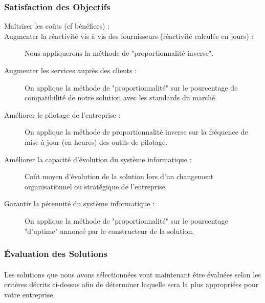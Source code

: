 \subsubsection{Satisfaction des Objectifs}

\begin{description}
\item[Maîtriser les coûts (cf bénéfices) :]
\item[Augmenter la réactivité vis à vis des fournisseurs (réactivité calculée en jours) :] Nous appliquerons la méthode de "proportionnalité inverse".
\item[Augmenter les services auprès des clients :] On applique la méthode de "proportionnalité" sur le pourcentage de compatibilité de notre solution avec les standards du marché. 
\item[Améliorer le pilotage de l'entreprise :] On applique la méthode de proportionnalité inverse sur la fréquence de mise à jour (en heures) des outils de pilotage.
\item[Améliorer la capacité d'évolution du système informatique :] Coût moyen d'évolution de la solution lors d'un changement organisationnel ou stratégique de l'entreprise
\item[Garantir la pérennité du système informatique :] On applique la méthode de "proportionnalité" sur le pourcentage "d'uptime" annoncé par le constructeur de la solution.
\end{description}


\subsubsection{Évaluation des Solutions}

\paragraph{} Les solutions que nous avons sélectionnées vont maintenant être évaluées selon les critères décrits ci-dessus afin de déterminer laquelle sera la plus appropriées pour votre entreprise.


